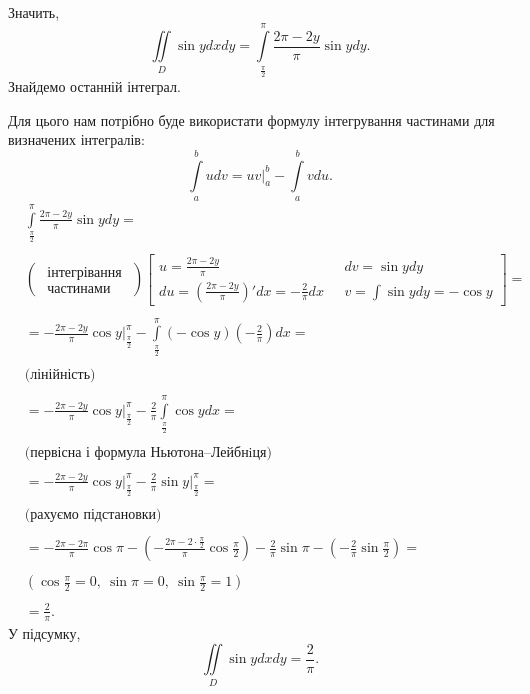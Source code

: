 \begin{example}
Значить,
\[
\iint\limits_D \sin y d x d y = \int\limits_{\frac{\pi}{2}}^{\pi}\frac{2\pi - 2 y}{\pi}\sin y dy.
\]
Знайдемо останній інтеграл.

Для цього нам потрібно буде використати формулу інтегрування частинами для визначених інтегралів:
\[
\int\limits_a^b u dv = u v \biggr|_a^b - \int\limits_a^b v du.
\]
\begin{align*}
&\int\limits_{\frac{\pi}{2}}^{\pi}\frac{2\pi - 2 y}{\pi}\sin y dy = &\\\\
&\left(\begin{array}{c}\mbox{ інтегрівання }\\ \mbox{ частинами }\end{array}\right)\left[\begin{array}{ll}u = \frac{2\pi - 2 y}{\pi} & \ \ \ dv = \sin y dy\\ du = \left(\frac{2\pi - 2 y}{\pi}\right)'dx = -\frac{2}{\pi}dx & \ \ \ v = \int \sin y dy = -\cos y\end{array}\right] = &\\\\
&= - \frac{2\pi - 2 y}{\pi} \cos y \biggr|_{\frac{\pi}{2}}^{\pi} - \int\limits_{\frac{\pi}{2}}^{\pi}\left(-\cos y\right)\left(-\frac{2}{\pi}\right)dx = & \\\\
&\mbox{(лінійність)} &\\\\
&= - \frac{2\pi - 2 y}{\pi} \cos y \biggr|_{\frac{\pi}{2}}^{\pi} - \frac{2}{\pi}\int\limits_{\frac{\pi}{2}}^{\pi}\cos ydx = &\\\\
&\mbox{(первісна і формула Ньютона--Лейбнiця)}&\\\\
&= - \frac{2\pi - 2 y}{\pi} \cos y \biggr|_{\frac{\pi}{2}}^{\pi} - \frac{2}{\pi}\sin y\biggr|_{\frac{\pi}{2}}^{\pi} = &\\\\
&\mbox{(рахуємо підстановки)}&\\\\
&= - \frac{2\pi - 2 \pi}{\pi} \cos \pi - \left(- \frac{2\pi - 2\cdot \frac{\pi}{2}}{\pi} \cos \frac{\pi}{2}\right) - \frac{2}{\pi}\sin \pi - \left(- \frac{2}{\pi}\sin\frac{\pi}{2}\right)=&\\\\
&\left(\cos\frac{\pi}{2}=0,\ \sin\pi = 0,\ \sin\frac{\pi}{2}=1\right)&\\\\
&=\frac{2}{\pi}.&
\end{align*}
У підсумку,
\[
\iint\limits_D \sin y d x d y = \frac{2}{\pi}.
\]
\end{example}
